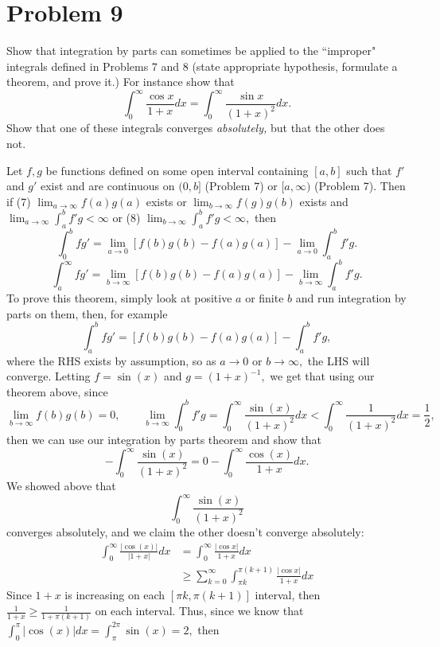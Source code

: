 \documentclass[11pt]{article}
\begin{document}
\newpage
\section*{Problem 9}
\begin{problem}
    Show that integration by parts can sometimes be applied to the ``improper" integrals defined in Problems 7 and 8 (state appropriate hypothesis, formulate a theorem, and prove it.) For instance show that 
\[\int_0^\infty \frac{\cos x}{1 + x}dx = \int_0^\infty \frac{\sin x}{(1 + x)^2}dx.\] Show that one of these integrals converges \textit{absolutely,} but that the other does not.
\end{problem}
\begin{solution}
    Let $f, g$ be functions defined on some open interval containing $[a, b]$ such that $f'$ and $g'$ exist and are continuous on $(0, b]$ (Problem 7) or $[a, \infty)$ (Problem 7). Then if (7) $\lim_{a\to \infty} f(a)g(a)$ exists or $\lim_{b\to \infty}f(g)g(b)$ exists and $\lim_{a\to \infty} \int_a^b f'g < \infty $ or (8) $\lim_{b\to \infty} \int_a^b f'g < \infty,$ then 
	\[
		\int_0^b fg' = \lim_{a\to 0} [f(b)g(b) - f(a)g(a)] - \lim_{a\to 0}\int_a^b f' g.
	\]
    \[\int_a^\infty fg' = \lim_{b\to \infty} [f(b)g(b) - f(a)g(a)] - \lim_{b\to \infty}\int_a^b f' g.\] To prove this theorem, simply look at positive $a$ or finite $b$ and run integration by parts on them, then, for example
    \[\int_a^b fg' = [f(b)g(b) - f(a)g(a)] - \int_a^b f'g,\] where the RHS exists by assumption, so as $a\to 0$ or $b\to \infty,$ the LHS will converge. 
    Letting $f = \sin(x)$ and $g = (1 + x)^{-1},$ we get that using our theorem above, since 
    \[\lim_{b\to \infty} f(b)g(b) = 0, \qquad \lim_{b\to \infty}\int_0^b f'g = \int_0^\infty \frac{\sin(x)}{(1 + x)^2}dx < \int_0^\infty \frac{1}{(1 + x)^2}dx = \frac{1}{2},\] then we can use our integration by parts theorem and show that 
    \[-\int_0^\infty \frac{\sin(x)}{(1 + x)^2} = 0 - \int_0^\infty \frac{\cos(x)}{1 + x} dx.\] We showed above that 
    \[\int_0^\infty \frac{\sin(x)}{(1 + x)^2}\] converges absolutely, and we claim the other doesn't converge absolutely:
    \begin{align*}
        \int_0^\infty \frac{|\cos(x)|}{|1 + x|}dx  &= \int_0^\infty \frac{|\cos x|}{1 + x}dx\\
        &\geq \sum_{k=0}^\infty \int_{\pi k}^{\pi(k+1)}\frac{|\cos x|}{1 + x} dx
    \end{align*}
    Since $1+x$ is increasing on each $[\pi k, \pi (k+1)]$ interval, then $\frac{1}{1 + x} \geq \frac{1}{1 + \pi(k+1)}$ on each interval. Thus, since we know that $\int_0^\pi |\cos(x)|dx = \int_\pi^{2\pi}\sin(x) = 2,$ then

\end{solution}
\end{document}
